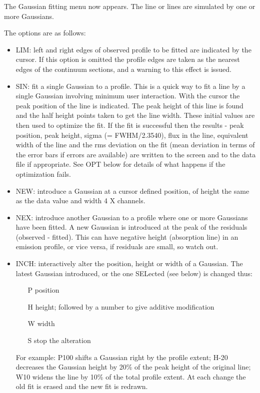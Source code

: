 The Gaussian fitting menu now appears. The line or lines are simulated by one
or more Gaussians.

The options are as follows:

\begin{itemize}
\item LIM: left and right edges of observed profile to be fitted are
   indicated by the cursor. If this option is omitted the profile edges
   are taken as the nearest edges of the continuum sections, and a
   warning to this effect is issued.
\item SIN: fit a single Gaussian to a profile. This is a quick way to
   fit a line by a single Gaussian involving minimum user interaction.
   With the cursor the peak position of the line is indicated. The peak
   height of this line is found and the half height points taken to get
   the line width. These initial values are then used to optimize the
   fit. If the fit is successful then the results - peak position, peak
   height, sigma (= FWHM/2.3540), flux in the line, equivalent width of
   the line and the rms deviation on the fit (mean deviation in terms of
   the error bars if errors are available) are written to the screen and
   to the data file if appropriate. See OPT below for details of what
   happens if the optimization fails.
\item NEW: introduce a Gaussian at a cursor defined position, of height
   the same as the data value and width 4 X channels.
\item NEX: introduce another Gaussian to a profile where one or more
   Gaussians have been fitted. A new Gaussian is introduced at the peak
   of the residuals (observed - fitted). This can have negative height
   (absorption line) in an emission profile, or vice versa, if residuals
   are small, so watch out.
\goodbreak
\item INCH: interactively alter the position, height or width of a
   Gaussian. The latest Gaussian introduced, or the one SELected (see
   below) is changed thus:
   \begin{itemize}
   \item[P] position
   \item[H] height; followed by a number to give additive modification 
   \item[W] width
   \item[S] stop the alteration
   \end{itemize}
   For example: P100 shifts a Gaussian right by the profile extent; H-20
   decreases the Gaussian height by 20\% of the peak height of the
   original line; W10 widens the line by 10\% of the total profile
   extent. At each change the old fit is erased and the new fit is
   redrawn.


\end{itemize}
